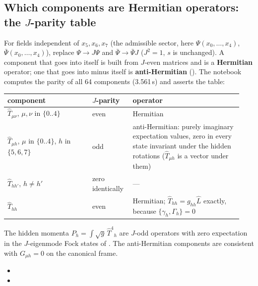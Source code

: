 \subsection{Which components are Hermitian operators: the \texorpdfstring{$J$}{J}-parity table}
\label{sec:7.5}

For fields independent of $x_5,x_6,x_7$ (the admissible sector, here $\Psi(x_0,\dots,x_4)$,
$\bar\Psi(x_0,\dots,x_4)$), replace $\Psi\to J\Psi$ and $\bar\Psi\to\bar\Psi J$ ($J^2=1$, $s$ is
unchanged). A component that goes into itself is built from $J$-even matrices and is a
\textbf{Hermitian} operator; one that goes into minus itself is \textbf{anti-Hermitian}
(). The notebook computes the parity of all 64 components (3.561\,s) and asserts the
table:

{\small
\begin{longtable}{@{}p{0.34\linewidth}p{0.16\linewidth}p{0.44\linewidth}@{}}
\toprule
\raggedright component & \raggedright $J$-parity & \raggedright operator \tabularnewline
\midrule
\endhead
\raggedright $\hat T_{\mu\nu}$, $\mu,\nu$ in $\{0..4\}$ & \raggedright even & \raggedright Hermitian \tabularnewline
\raggedright $\hat T_{\mu h}$, $\mu$ in $\{0..4\}$, $h$ in $\{5,6,7\}$ & \raggedright odd & \raggedright anti-Hermitian: purely imaginary expectation values, zero in every state invariant under the hidden rotations ($\hat T_{\mu h}$ is a vector under them) \tabularnewline
\raggedright $\hat T_{hh'}$, $h\neq h'$ & \raggedright zero identically & \raggedright --- \tabularnewline
\raggedright $\hat T_{hh}$ & \raggedright even & \raggedright Hermitian; $\hat T_{hh}=g_{hh}\hat L$ exactly, because $\{\gamma_h,\Gamma_h\}=0$ \tabularnewline
\bottomrule
\end{longtable}
}

The hidden momenta $P_h=\int\sqrt g\,\hat T^4{}_h$ are $J$-odd operators with zero expectation in the
$J$-eigenmode Fock states of  . The anti-Hermitian components are
consistent with $G_{\mu h}=0$ on the canonical frame. 
\begin{itemize}
  \item {}
  \item {}
\end{itemize}

